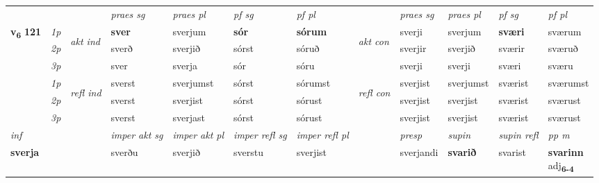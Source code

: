 \begin{longtable}[l]{X>{\footnotesize\itshape}llXXXXlXXXX}
 & &   & \textit{praes sg}  & \textit{praes pl}    & \textit{ pf sg} & \textit{pf pl} & & \textit{praes sg}  & \textit{praes pl}    & \textit{pf sg} & \textit{pf pl }  \\ \cmidrule{4-7} \cmidrule{9-12}
 \multirow{2}{*}{{{\textbf{v{\textsubscript{6}}} \Large{\textbf{121}}}}}  & 1p & \multirow{3}{*}{\begin{turn}{90}\textit{akt ind}\end{turn}} & \textbf{sver} & sverjum & \textbf{sór} & \textbf{sórum} & \multirow{3}{*}{\begin{turn}{90}\textit{akt con}\end{turn}} &sverji & sverjum & \textbf{sværi} & sværum\\*
 & 2p &  &  sverð  & sverjið & sórst & sóruð & & sverjir & sverjið & sværir & sværuð \\*
 & 3p &  & sver & sverja & sór & sóru & & sverji & sverji& sværi & sværu \\*
\cmidrule{4-7} \cmidrule{9-12}
 & 1p & \multirow{3}{*}{\begin{turn}{90}\textit{refl ind}\end{turn}}  & sverst & sverjumst & sórst & sórumst & \multirow{3}{*}{\begin{turn}{90}\textit{refl con}\end{turn}}  &sverjist & sverjumst & sværist & sværumst \\*
 & 2p &  & sverst & sverjist & sórst & sórust & &sverjist & sverjist & sværist & sværust \\*
 & 3p  & & sverst & sverjast & sórst & sórust & & sverjist & sverjist& sværist & sværust \\*
\cmidrule{4-7} \cmidrule{9-12}

   {\textit{inf}} & &  & \textit{imper akt sg} & \textit{imper akt pl} & \textit{imper refl sg} & \textit{imper refl pl} && \textit{presp} & \textit{supin} & \textit{supin refl} & \textit{pp m} \\*
  {\textbf{sverja}} & && sverðu  & sverjið & sverstu & sverjist && sverjandi &  \textbf{svarið} & svarist & \specialcell{\textbf{svarinn} \\ adj\textbf{\textsubscript{6-4}}} \\*

\midrule


\end{longtable}
